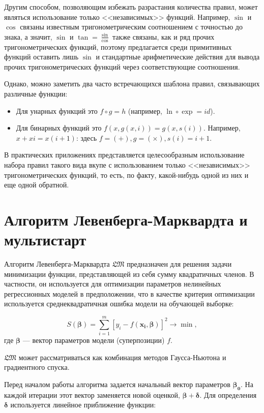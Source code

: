 \documentclass[12pt,a4paper]{amsart}
\begin{document}
Другим способом, позволяющим избежать разрастания количества правил, может
являться использование только <<независимых>> функций. Например, $\sin$ и
$\cos$ связаны известным тригонометрическим соотношением с точностью до знака,
а значит, $\sin$ и $\tan = \frac{\sin}{\cos}$ также связаны, как и ряд прочих
тригонометрических функций, поэтому предлагается среди примитивных функций
оставить лишь $\sin$ и стандартные арифметические действия для вывода прочих
тригонометрических функций через соответствующие соотношения.

Однако, можно заметить два часто встречающихся шаблона правил, связывающих
различные функции:
\begin{itemize}
  \item Для унарных функций это $f \circ g = h$ (например,
	$\ln \circ \exp = id$).
  \item Для бинарных функций это $ f (x, g (x, i)) = g (x, s (i)) $.
	Например, $x + xi = x(i+1)$: здесь $f = (+), g = (\times), s(i) = i + 1$.
\end{itemize}

В практических приложениях представляется целесообразным использование набора правил
такого вида вкупе с использованием только <<независимых>> тригонометрических
функций, то есть, по факту, какой-нибудь одной из них и еще одной обратной.

\section{Алгоритм Левенберга-Марквардта и мультистарт}

Алгоритм Левенберга-Марквардта $\mathfrak{LM}$ предназначен для решения
задачи минимизации функции, представляющей из себя сумму квадратичных членов.
В частности, он используется для оптимизации параметров нелинейных регрессионных
моделей в предположении, что в качестве критерия оптимизации используется
среднеквадратичная ошибка модели на обучающей выборке:

\[
S(\mathbf{\beta}) = \sum_{i=1}^{m} [y_i - f(\mathbf{x_i}, \mathbf{\beta})]^2 \to \min,
\]
где $\mathbf{\beta}$ --- вектор параметров модели (суперпозиции) $f$.

$\mathfrak{LM}$ может рассматриваться как комбинация методов Гаусса-Ньютона и
градиентного спуска.

Перед началом работы алгоритма задается начальный вектор параметров $\mathbf{\beta_0}$.
На каждой итерации этот вектор заменяется новой оценкой, $\mathbf{\beta + \delta}$.
Для определения $\mathbf{\delta}$ используется линейное приближение функции:
\end{document}
